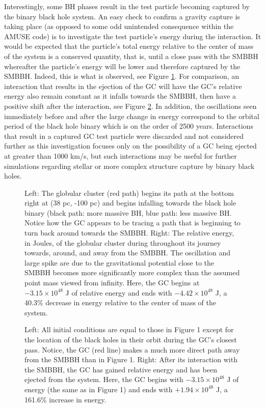 \documentclass{aastex62}
\begin{document}
Interestingly, some BH phases result in the test particle becoming captured by the binary black hole system. An easy check to confirm a gravity capture is taking place (as opposed to some odd unintended consequence within the AMUSE code) is to investigate the test particle's energy during the interaction. It would be expected that the particle's total energy relative to the center of mass of the system is a conserved quantity, that is, until a close pass with the SMBBH whereafter the particle's energy will be lower and therefore captured by the SMBBH. Indeed, this is what is observed, see Figure \ref{fig3}. For comparison, an interaction that results in the ejection of the GC will have the GC's relative energy also remain constant as it infalls towards the SMBBH, then have a positive shift after the interaction, see Figure \ref{fig4}. In addition, the oscillations seen immediately before and after the large change in energy correspond to the orbital period of the black hole binary which is on the order of 2500 years. Interactions that result in a captured GC test particle were discarded and not considered further as this investigation focuses only on the possibility of a GC being ejected at greater than 1000 km/s, but such interactions may be useful for further simulations regarding stellar or more complex structure capture by binary black holes.
\begin{figure}
\caption{Left: The globular cluster (red path) begins its path at the bottom right at (38 pc, -100 pc) and begins infalling towards the black hole binary (black path: more massive BH, blue path: less massive BH. Notice how the GC appears to be tracing a path that is beginning to turn back around towards the SMBBH. Right: The relative energy, in Joules, of the globular cluster during throughout its journey towards, around, and away from the SMBBH. The oscillation and large spike are due to the gravitational potential close to the SMBBH becomes more significantly more complex than the assumed point mass viewed from infinity. Here, the GC begins at $-3.15\times10^{48}$ J of relative energy and ends with $-4.42\times10^{48}$ J, a 40.3\% decrease in energy relative to the center of mass of the system.\label{fig3}}
\end{figure}
\begin{figure}
\caption{Left: All initial conditions are equal to those in Figure 1 except for the location of the black holes in their orbit during the GC's closest pass. Notice, the GC (red line) makes a much more direct path away from the SMBBH than in Figure 1. Right: After its interaction with the SMBBH, the GC has gained relative energy and has been ejected from the system. Here, the GC begins with $-3.15\times10^{48}$ J of energy (the same as in Figure 1) and ends with $+1.94\times10^{48}$ J, a 161.6\% increase in energy.\label{fig4}}
\end{figure}
\end{document}
